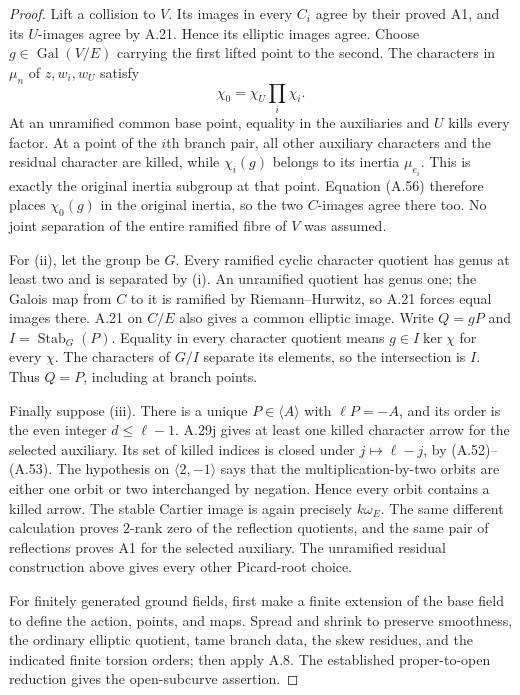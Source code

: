 \begin{proof}
Lift a collision to $V$. Its images in every $C_i$
agree by their proved A1, and its $U$-images agree
by A.21. Hence its elliptic images agree. Choose
$g\in\operatorname{Gal}(V/E)$ carrying the first
lifted point to the second. The characters in
$\mu_n$ of $z,w_i,w_U$ satisfy
\[
 \chi_0=\chi_U\prod_i\chi_i.                            \tag{A.56}
\]
At an unramified common base point, equality in
the auxiliaries and $U$ kills every factor.
At a point of the $i$th branch pair, all other
auxiliary characters and the residual character
are killed, while $\chi_i(g)$ belongs to its
inertia $\mu_{e_i}$. This is exactly the original
inertia subgroup at that point. Equation
\textup{(A.56)} therefore places $\chi_0(g)$ in
the original inertia, so the two $C$-images agree
there too. No joint separation of the entire
ramified fibre of $V$ was assumed.

For \textup{(ii)}, let the group be $G$. Every
ramified cyclic character quotient has genus at
least two and is separated by \textup{(i)}.
An unramified quotient has genus one; the Galois
map from $C$ to it is ramified by Riemann--Hurwitz,
so A.21 forces equal images there. A.21 on $C/E$
also gives a common elliptic image. Write
$Q=gP$ and $I=\operatorname{Stab}_G(P)$.
Equality in every character quotient means
$g\in I\ker\chi$ for every $\chi$. The characters
of $G/I$ separate its elements, so the intersection
is $I$. Thus $Q=P$, including at branch points.

Finally suppose \textup{(iii)}. There is a unique
$P\in\langle A\rangle$ with $\ell P=-A$, and its
order is the even integer $d\le\ell-1$.
A.29j gives at least one killed character arrow
for the selected auxiliary. Its set of killed
indices is closed under $j\mapsto\ell-j$, by
\textup{(A.52)--(A.53)}.
The hypothesis on $\langle2,-1\rangle$ says that
the multiplication-by-two orbits are either one
orbit or two interchanged by negation. Hence every
orbit contains a killed arrow. The stable Cartier
image is again precisely $k\omega_E$. The same
different calculation proves $2$-rank zero of
the reflection quotients, and the same pair of
reflections proves A1 for the selected auxiliary.
The unramified residual construction above gives
every other Picard-root choice.

For finitely generated ground fields, first make
a finite extension of the base field to define
the action, points, and maps. Spread and shrink
to preserve smoothness, the ordinary elliptic
quotient, tame branch data, the skew residues,
and the indicated finite torsion orders; then
apply A.8. The established proper-to-open
reduction gives the open-subcurve assertion.


\end{proof}
